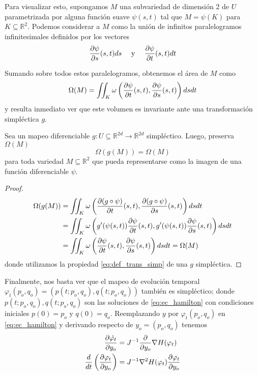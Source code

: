 Para visualizar esto, supongamos $M$ una subvariedad de dimensión 2 de $U$ parametrizada por alguna función suave $\psi(s,t)$ tal que $M=\psi(K)$ para $K\subseteq\mathbb{R}^2$.
Podemos considerar a $M$ como la unión de infinitos paralelogramos infinitesimales definidos por los vectores
\[ \frac{\partial\psi}{\partial s}(s,t)ds \quad \text{ y } \quad \frac{\partial\psi}{\partial t}(s,t)dt \]

Sumando sobre todos estos paralelogramos, obtenemos el área de $M$ como
\begin{equation}{\label{eq:area_orien_simp}}
 \Omega(M) = \iint_K \omega\left(\frac{\partial\psi}{\partial t}(s,t), \frac{\partial\psi}{\partial s}(s,t)\right) ds dt
\end{equation}
y resulta inmediato ver que este volumen es invariante ante una transformación simpléctica $g$.

\begin{theorem}{\label{teo:preservacion_vol}}
 Sea un mapeo diferenciable $g:U\subseteq\mathbb{R}^{2d}\to\mathbb{R}^{2d}$ simpléctico. Luego, preserva $\Omega(M)$
 \[ \Omega(g(M)) = \Omega(M) \]
 para toda variedad $M\subseteq\mathbb{R}^2$ que pueda representarse como la imagen de una función diferenciable $\psi$.
\end{theorem}
\begin{proof}
\begin{align*}
 \Omega(g(M)) &=  \iint_K \omega\left(\frac{\partial(g\circ\psi)}{\partial t}(s,t), \frac{\partial(g\circ\psi)}{\partial s}(s,t)\right) ds dt \\
&= \iint_K \omega\left(g'(\psi(s,t))\frac{\partial\psi}{\partial t}(s,t), g'(\psi(s,t))\frac{\partial\psi}{\partial s}(s,t)\right) ds dt \\
&= \iint_K \omega\left(\frac{\partial\psi}{\partial t}(s,t), \frac{\partial\psi}{\partial s}(s,t)\right) ds dt = \Omega(M) 
\end{align*}
donde utilizamos la propiedad \eqref{eq:def_trans_simp} de una $g$ simpléctica.
\end{proof}

Finalmente, nos basta ver que el mapeo de evolución temporal $\varphi_t(p_o,q_o) = (p(t;p_o,q_o), q(t;p_o,q_o))$ también es simpléctico; donde $p(t;p_o,q_o), q(t;p_o,q_o)$ son las soluciones de \eqref{eq:ec_hamilton}
con condiciones iniciales $p(0)=p_o$ y $q(0)=q_o$.
Reemplazando $y$ por $\varphi_t(p_o,q_o)$ en \eqref{eq:ec_hamilton} y derivando respecto de $y_o=(p_o,q_o)$ tenemos
\begin{align*}
 \frac{\partial\dot{\varphi_t}}{\partial y_o} &= J^{-1}\frac{\partial}{\partial y_o} \nabla H(\varphi_t) \\
 \frac{d}{dt}\left(\frac{\partial\varphi_t}{\partial y_o}\right) &= J^{-1} \nabla^2 H(\varphi_t)\frac{\partial\varphi_t}{\partial y_o}
\end{align*}

